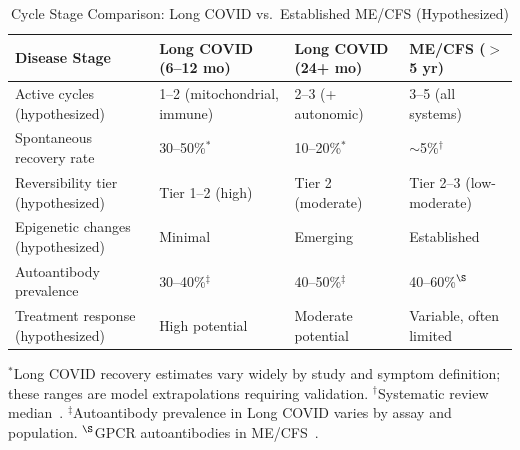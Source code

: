 \begin{table}[htbp]
\centering
\caption{Cycle Stage Comparison: Long COVID vs.\ Established ME/CFS (Hypothesized)}
\label{tab:long-covid-stages}
\begin{tabular}{p{3cm}p{3.5cm}p{3.5cm}p{3cm}}
\toprule
\textbf{Disease Stage} & \textbf{Long COVID (6--12 mo)} & \textbf{Long COVID (24+ mo)} & \textbf{ME/CFS ($>$5 yr)} \\
\midrule
Active cycles (hypothesized) & 1--2 (mitochondrial, immune) & 2--3 (+ autonomic) & 3--5 (all systems) \\
\addlinespace
Spontaneous recovery rate & 30--50\%$^*$ & 10--20\%$^*$ & $\sim$5\%$^\dagger$ \\
\addlinespace
Reversibility tier (hypothesized) & Tier 1--2 (high) & Tier 2 (moderate) & Tier 2--3 (low-moderate) \\
\addlinespace
Epigenetic changes (hypothesized) & Minimal & Emerging & Established \\
\addlinespace
Autoantibody prevalence & 30--40\%$^\ddagger$ & 40--50\%$^\ddagger$ & 40--60\%$^\S$ \\
\addlinespace
Treatment response (hypothesized) & High potential & Moderate potential & Variable, often limited \\
\bottomrule
\end{tabular}

\smallskip
\footnotesize{$^*$Long COVID recovery estimates vary widely by study and symptom definition; these ranges are model extrapolations requiring validation. $^\dagger$Systematic review median~\cite{Cairns2005prognosis}. $^\ddagger$Autoantibody prevalence in Long COVID varies by assay and population. $^\S$GPCR autoantibodies in ME/CFS~\cite{Loebel2016}.}
\end{table}

